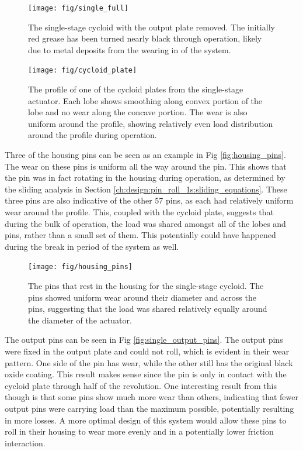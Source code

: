 \begin{figure}[h]
   \centering
   \texttt{[image: fig/single\_full]}
   \caption{The single-stage cycloid with the output plate removed. The initially red grease has been turned nearly black through operation, likely due to metal deposits from the wearing in of the system.}
   \label{fig:single_full}
\end{figure}

\begin{figure}[h]
   \centering
   \texttt{[image: fig/cycloid\_plate]}
   \caption{The profile of one of the cycloid plates from the single-stage actuator. Each lobe shows smoothing along convex portion of the lobe and no wear along the concave portion. The wear is also uniform around the profile, showing relatively even load distribution around the profile during operation.}
   \label{fig:cycloid_plate}
\end{figure}


Three of the housing pins can be seen as an example in Fig \ref{fig:housing_pins}. The wear on these pins is uniform all the way around the pin. This shows that the pin was in fact rotating in the housing during operation, as determined by the sliding analysis in Section \ref{ch:design:pin_roll_1s:sliding_equations}. These three pins are also indicative of the other 57 pins, as each had relatively uniform wear around the profile. This, coupled with the cycloid plate, suggests that during the bulk of operation, the load was shared amongst all of the lobes and pins, rather than a small set of them. This potentially could have happened during the break in period of the system as well. 

\begin{figure}[h]
   \centering
   \texttt{[image: fig/housing\_pins]}
   \caption{The pins that rest in the housing for the single-stage cycloid. The pins showed uniform wear around their diameter and across the pins, suggesting that the load was shared relatively equally around the diameter of the actuator.}
   \label{fig:single_housing_pins}
\end{figure}


The output pins can be seen in Fig \ref{fig:single_output_pins}. The output pins were fixed in the output plate and could not roll, which is evident in their wear pattern. One side of the pin has wear, while the other still has the original black oxide coating. This result makes sense since the pin is only in contact with the cycloid plate through half of the revolution. One interesting result from this though is that some pins show much more wear than others, indicating that fewer output pins were carrying load than the maximum possible, potentially resulting in more losses. A more optimal design of this system would allow these pins to roll in their housing to wear more evenly and in a potentially lower friction interaction. 


